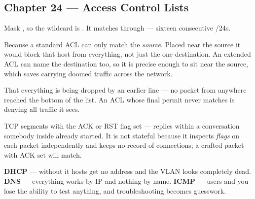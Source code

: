 \subsection*{Chapter 24 --- Access Control Lists}
\begin{tightnum}
  \item Mask , so the wildcard is . It matches
         through  --- sixteen consecutive /24s.
  \item Because a standard ACL can only match the \emph{source}. Placed near the
        source it would block that host from everything, not just the one
        destination. An extended ACL can name the destination too, so it is
        precise enough to sit near the source, which saves carrying doomed traffic
        across the network.
  \item That everything is being dropped by an earlier line --- no packet from
        anywhere reached the bottom of the list. An ACL whose final permit never
        matches is denying all traffic it sees.
  \item TCP segments with the ACK or RST flag set --- replies within a conversation
        somebody inside already started. It is not stateful because it inspects
        \emph{flags} on each packet independently and keeps no record of
        connections; a crafted packet with ACK set will match.
  \item \textbf{DHCP} --- without it hosts get no address and the VLAN looks
        completely dead. \textbf{DNS} --- everything works by IP and nothing by
        name. \textbf{ICMP} --- users and you lose the ability to test anything,
        and troubleshooting becomes guesswork.
\end{tightnum}

